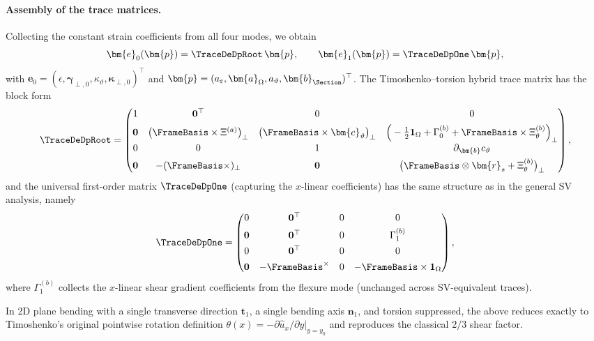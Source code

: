 \paragraph{Assembly of the trace matrices.}

Collecting the constant strain coefficients from all four modes, we obtain
\begin{equation}
\bm{e}_0(\bm{p})
=
\TraceDeDpRoot\,\bm{p},
\qquad
\bm{e}_1(\bm{p})
=
\TraceDeDpOne\,\bm{p},
\end{equation}
with $\bm{e}_0 = (\epsilon,\bm{\gamma}_{\perp,0},\kappa_\vartheta,
\bm{\kappa}_{\perp,0})^\top$ and $\bm{p}=(a_\varepsilon,\bm{a}_\Omega,
a_\vartheta,\bm{b}_{\Section})^\top$. The Timoshenko–torsion hybrid trace matrix 
has the block form
\begin{equation}
\TraceDeDpRoot
=
\begin{pmatrix}
1 & \mathbf{0}^\top & 0 & 0 \\[4pt]
\mathbf{0} 
& \big(\FrameBasis\times\Xi^{(a)}\big)_\perp 
& \big(\FrameBasis\times\bm{c}_\vartheta\big)_\perp 
& \Big(-\tfrac{1}{2}\mathbf{1}_\Omega 
      + \Gamma^{(b)}_0 
      + \FrameBasis\times\Xi^{(b)}_\theta\Big)_\perp \\[4pt]
0 & 0 & 1 & \partial_{\bm{b}}c_\vartheta \\[4pt]
\mathbf{0} 
& -(\FrameBasis\times)_\perp 
& \mathbf{0} 
& \big(\FrameBasis\otimes\bm{r}_s + \Xi^{(b)}_\theta\big)_\perp
\end{pmatrix},
\label{eq:T0-tim-hybrid}
\end{equation}
and the universal first-order matrix $\TraceDeDpOne$ (capturing the $x$-linear 
coefficients) has the same structure as in the general SV analysis, namely
\begin{equation}
\TraceDeDpOne
=
\begin{pmatrix}
0 & \mathbf{0}^\top & 0 & 0 \\[4pt]
\mathbf{0} & \mathbf{0}^\top & 0 & \Gamma^{(b)}_1 \\[4pt]
0 & \mathbf{0}^\top & 0 & 0 \\[4pt]
\mathbf{0} & -\FrameBasis^{\times} & 0 & -\FrameBasis\times\mathbf{1}_\Omega
\end{pmatrix},
\label{eq:T1-tim-hybrid}
\end{equation}
where $\Gamma^{(b)}_1$ collects the $x$-linear shear gradient coefficients 
from the flexure mode (unchanged across SV-equivalent traces). 

In 2D plane bending with a single transverse direction $\bm{t}_1$, a single 
bending axis $\bm{n}_1$, and torsion suppressed, the above reduces exactly to 
Timoshenko’s original pointwise rotation definition 
$\theta(x) = -\partial\hat{u}_x/\partial y|_{y=y_0}$ and reproduces the 
classical $2/3$ shear factor.
